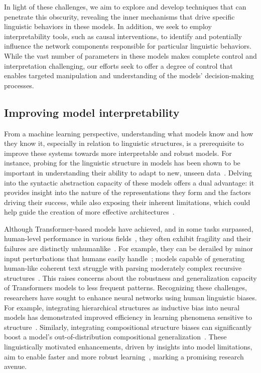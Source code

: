  
In light of these challenges, we aim to explore and develop techniques that can penetrate this obscurity, revealing the inner mechanisms that drive specific linguistic behaviors in these models. In addition, we seek to employ interpretability tools, such as causal interventions, to identify and potentially influence the network components responsible for particular linguistic behaviors. While the vast number of parameters in these models makes complete control and interpretation challenging, our efforts seek to offer a degree of control that enables targeted manipulation and understanding of the models' decision-making processes.


\subsection{Improving model interpretability} 
From a machine learning perspective, understanding what models know and how they know it, especially in relation to linguistic structures, is a prerequisite to improve these systems towards more interpretable and robust models. %
For instance, probing for the linguistic structure in models has been shown to be important in understanding their ability to adapt to new, unseen data~\citep{marasovic2018nlp}. Delving into the syntactic abstraction capacity of these models offers a dual advantage: it provides insight into the nature of the representations they form and the factors driving their success, while also exposing their inherent limitations, which could help guide the creation of more effective architectures~\citep{lake2017building,marcus2018deep}.

Although Transformer-based models have achieved, and in some tasks surpassed, human-level performance in various fields~\citep{otter2020survey,lertvittayakumjorn2021explanation,khurana2023natural}, they often exhibit fragility and their failures are distinctly unhumanlike~\citep{firestone2020performance}. For example, they can be derailed by minor input perturbations that humans easily handle~\citep{firestone2020performance,wang2022bert}; models capable of generating human-like coherent text struggle with parsing moderately complex recursive structures~\citep{yao-koller-2022-structural}. This raises concerns about the robustness and generalization capacity of Transformers models to less frequent patterns. Recognizing these challenges, researchers have sought to enhance neural networks using human linguistic biases. For example, integrating hierarchical structures as inductive bias into neural models has demonstrated improved efficiency in learning phenomena sensitive to structure~\citep{kuncoro-etal-2018-lstms,wilcox-etal-2019-structural,qian-etal-2021-structural}. Similarly, integrating compositional structure biases can significantly boost a model's out-of-distribution compositional generalization~\citep{qiu-etal-2022-improving}. These linguistically motivated enhancements, driven by insights into model limitations, aim to enable faster and more robust learning~\citep{lake2017building,besold2017neuralsymbolic}, marking a promising research avenue.

